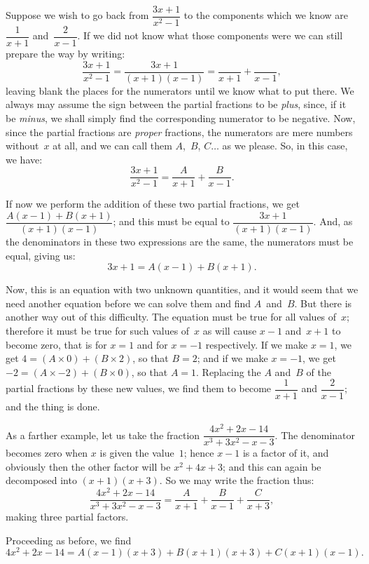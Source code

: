\documentclass[12pt]{book}[2005/09/16]
\newcommand{\DPPageSep}[2]{\Pagelabel{#2}}
\newcommand{\Pagelabel}[1]
  {\phantomsection\label{#1}}
\begin{document}
Suppose we wish to go back from $\dfrac{3x+1}{x^2-1}$ to the
components which we know are $\dfrac{1}{x+1}$ and~$\dfrac{2}{x-1}$. If
we did not know what those components were we can
still prepare the way by writing:
\[
\frac{3x+1}{x^2-1} = \frac{3x+1}{(x+1)(x-1)} = \frac{}{x+1} + \frac{}{x-1},
\]
leaving blank the places for the numerators until we
know what to put there. We always may assume the
sign between the partial fractions to be \emph{plus}, since, if
it be \emph{minus}, we shall simply find the corresponding
numerator to be negative. Now, since the partial
fractions are \emph{proper} fractions, the numerators are
mere numbers without~$x$ at all, and we can call them
$A$,~$B$, $C\dots$ as we please. So, in this case, we have:
\[
\frac{3x+1}{x^2-1} = \frac{A}{x+1} + \frac{B}{x-1}.
\]

If now we perform the addition of these two
partial fractions, we get $\dfrac{A(x-1)+B(x+1)}{(x+1)(x-1)}$; and this
must be equal to $\dfrac{3x+1}{(x+1)(x-1)}$. And, as the denominators
in these two expressions are the same,
the numerators must be equal, giving us:
\[
3x + 1 = A(x-1) + B(x + 1).
\]

Now, this is an equation with two unknown
quantities, and it would seem that we need another
equation before we can solve them and find $A$~and~$B$.
\DPPageSep{136.png}{124}%
But there is another way out of this difficulty. The
equation must be true for all values of~$x$; therefore
it must be true for such values of~$x$ as will cause
$x-1$ and~$x+1$ to become zero, that is for $x=1$ and
for $x=-1$ respectively. If we make $x=1$, we get
$4 = (A × 0)+(B × 2)$, so that $B=2$; and if we make
$x=-1$, we get $-2 = (A × -2) + (B × 0)$, so that $A=1$.
Replacing the $A$ and~$B$ of the partial fractions by
these new values, we find them to become $\dfrac{1}{x+1}$ and
$\dfrac{2}{x-1}$; and the thing is done.

As a farther example, let us take the fraction
$\dfrac{4x^2 + 2x - 14}{x^3 + 3x^2 - x - 3}$. The denominator becomes zero when
$x$ is given the value~$1$; hence $x-1$ is a factor of it,
and obviously then the other factor will be $x^2 + 4x + 3$;
and this can again be decomposed into $(x+1)(x+3)$.
So we may write the fraction thus:
\[
\frac{4x^2 + 2x - 14}{x^3 + 3x^2 - x - 3}
  = \frac{A}{x+1} + \frac{B}{x-1} + \frac{C}{x+3},
\]
making three partial factors.

Proceeding as before, we find
\[%
4x^2 + 2x - 14 = A(x-1)(x+3) + B(x+1)(x+3) + C(x+1)(x-1).
\]
\end{document}
